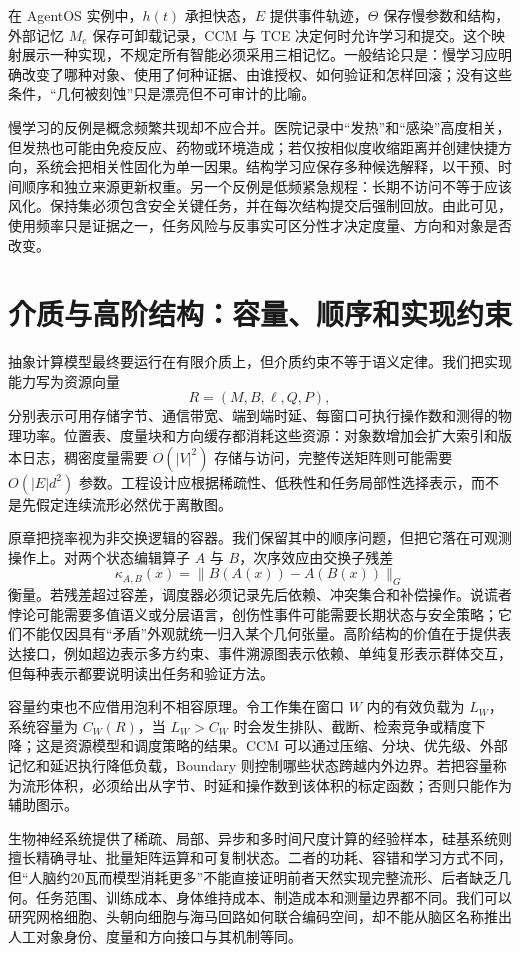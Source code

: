在 AgentOS 实例中，$h(t)$ 承担快态，$E$ 提供事件轨迹，$\Theta$ 保存慢参数和结构，外部记忆 $M_e$ 保存可卸载记录，CCM 与 TCE 决定何时允许学习和提交。这个映射展示一种实现，不规定所有智能必须采用三相记忆。一般结论只是：慢学习应明确改变了哪种对象、使用了何种证据、由谁授权、如何验证和怎样回滚；没有这些条件，“几何被刻蚀”只是漂亮但不可审计的比喻。

慢学习的反例是概念频繁共现却不应合并。医院记录中“发热”和“感染”高度相关，但发热也可能由免疫反应、药物或环境造成；若仅按相似度收缩距离并创建快捷方向，系统会把相关性固化为单一因果。结构学习应保存多种候选解释，以干预、时间顺序和独立来源更新权重。另一个反例是低频紧急规程：长期不访问不等于应该风化。保持集必须包含安全关键任务，并在每次结构提交后强制回放。由此可见，使用频率只是证据之一，任务风险与反事实可区分性才决定度量、方向和对象是否改变。

\section{介质与高阶结构：容量、顺序和实现约束}
\label{sec:dictatorship_of_the_medium}

抽象计算模型最终要运行在有限介质上，但介质约束不等于语义定律。我们把实现能力写为资源向量
\[
R=(M,B,\ell,Q,P),
\]
分别表示可用存储字节、通信带宽、端到端时延、每窗口可执行操作数和测得的物理功率。位置表、度量块和方向缓存都消耗这些资源：对象数增加会扩大索引和版本日志，稠密度量需要 $O(|V|^2)$ 存储与访问，完整传送矩阵则可能需要 $O(|E|d^2)$ 参数。工程设计应根据稀疏性、低秩性和任务局部性选择表示，而不是先假定连续流形必然优于离散图。

原章把挠率视为非交换逻辑的容器。我们保留其中的顺序问题，但把它落在可观测操作上。对两个状态编辑算子 $A$ 与 $B$，次序效应由交换子残差
\[
\kappa_{A,B}(x)=\|B(A(x))-A(B(x))\|_{G}
\]
衡量。若残差超过容差，调度器必须记录先后依赖、冲突集合和补偿操作。说谎者悖论可能需要多值语义或分层语言，创伤性事件可能需要长期状态与安全策略；它们不能仅因具有“矛盾”外观就统一归入某个几何张量。高阶结构的价值在于提供表达接口，例如超边表示多方约束、事件溯源图表示依赖、单纯复形表示群体交互，但每种表示都要说明读出任务和验证方法。

容量约束也不应借用泡利不相容原理。令工作集在窗口 $W$ 内的有效负载为 $L_W$，系统容量为 $C_W(R)$，当 $L_W>C_W$ 时会发生排队、截断、检索竞争或精度下降；这是资源模型和调度策略的结果。CCM 可以通过压缩、分块、优先级、外部记忆和延迟执行降低负载，Boundary 则控制哪些状态跨越内外边界。若把容量称为流形体积，必须给出从字节、时延和操作数到该体积的标定函数；否则只能作为辅助图示。

生物神经系统提供了稀疏、局部、异步和多时间尺度计算的经验样本，硅基系统则擅长精确寻址、批量矩阵运算和可复制状态。二者的功耗、容错和学习方式不同，但“人脑约20瓦而模型消耗更多”不能直接证明前者天然实现完整流形、后者缺乏几何。任务范围、训练成本、身体维持成本、制造成本和测量边界都不同。我们可以研究网格细胞、头朝向细胞与海马回路如何联合编码空间，却不能从脑区名称推出人工对象身份、度量和方向接口与其机制等同。

